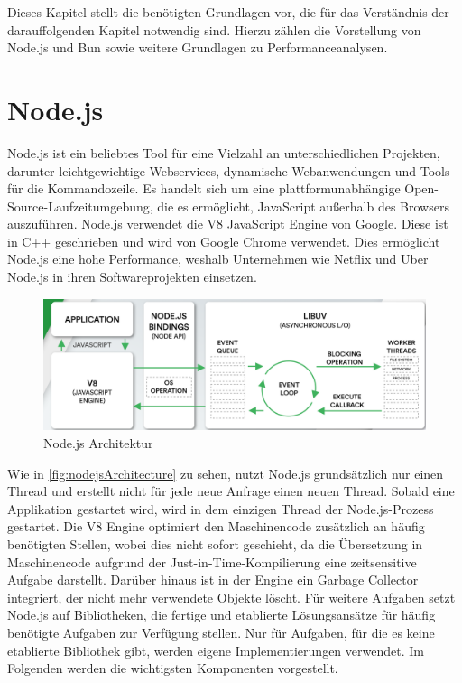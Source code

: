  \label{ch:foundations}
Dieses Kapitel stellt die benötigten Grundlagen vor, die für das Verständnis der darauffolgenden Kapitel notwendig sind. Hierzu zählen die Vorstellung von Node.js und Bun sowie weitere Grundlagen zu Performanceanalysen.

\section{Node.js} \label{sec:foundations-Node.js}
Node.js ist ein beliebtes Tool für eine Vielzahl an unterschiedlichen Projekten, darunter leichtgewichtige Webservices, dynamische Webanwendungen und Tools für die Kommandozeile. Es handelt sich um eine plattformunabhängige Open-Source-Laufzeitumgebung, die es ermöglicht, JavaScript außerhalb des Browsers auszuführen. Node.js verwendet die V8 JavaScript Engine von Google. Diese ist in C++ geschrieben und wird von Google Chrome verwendet. Dies ermöglicht Node.js eine hohe Performance, weshalb Unternehmen wie Netflix und Uber Node.js in ihren Softwareprojekten einsetzen.\cite{OpenJSFoundation.2022}\\

\begin{figure}[h]
	\centering
	\includegraphics[width=\linewidth]{./images/NodeJsArchitecture}
	\caption[Node.js Architektur]{Node.js Architektur \cite{Kaneriya.2022}}
	\label{fig:nodejsArchitecture}
\end{figure}
 
\noindent
Wie in \autoref{fig:nodejsArchitecture} zu sehen, nutzt Node.js grundsätzlich nur einen Thread und erstellt nicht für jede neue Anfrage einen neuen Thread. Sobald eine Applikation gestartet wird, wird in dem einzigen Thread der Node.js-Prozess gestartet. Die V8 Engine optimiert den Maschinencode zusätzlich an häufig benötigten Stellen, wobei dies nicht sofort geschieht, da die Übersetzung in Maschinencode aufgrund der Just-in-Time-Kompilierung eine zeitsensitive Aufgabe darstellt. Darüber hinaus ist in der Engine ein Garbage Collector integriert, der nicht mehr verwendete Objekte löscht.\cite{Springer.2022} \newline 
Für weitere Aufgaben setzt Node.js auf Bibliotheken, die fertige und etablierte Lösungsansätze für häufig benötigte Aufgaben zur Verfügung stellen. Nur für Aufgaben, für die es keine etablierte Bibliothek gibt, werden eigene Implementierungen verwendet. Im Folgenden werden die wichtigsten Komponenten vorgestellt.\cite{Springer.2022}\\


